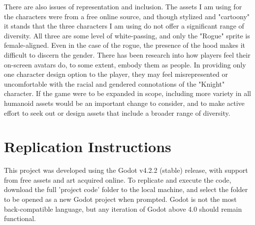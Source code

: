 \documentclass[10pt,twocolumn]{article}
\begin{document}
There are also issues of representation and inclusion. The assets I am using for the characters were from a free online source, and though stylized and "cartoony" it stands that the three characters I am using do not offer a significant range of diversity. All three are some level of white-passing, and only the "Rogue" sprite is female-aligned. Even in the case of the rogue, the presence of the hood makes it difficult to discern the gender. \cite{ethics} There has been research into how players feel their on-screen avatars do, to some extent, embody them as people. In providing only one character design option to the player, they may feel misrepresented or uncomfortable with the racial and gendered connotations of the "Knight" character. If the game were to be expanded in scope, including more variety in all humanoid assets would be an important change to consider, and to make active effort to seek out or design assets that include a broader range of diversity.



\appendix
\section{Replication Instructions}
This project was developed using the Godot v4.2.2 (stable) release, with support from free assets and art acquired online. To replicate and execute the code, download the full 'project code' folder to the local machine, and select the folder to be opened as a new Godot project when prompted. Godot is not the most back-compatible language, but any iteration of Godot above 4.0 should remain functional.
\end{document}
